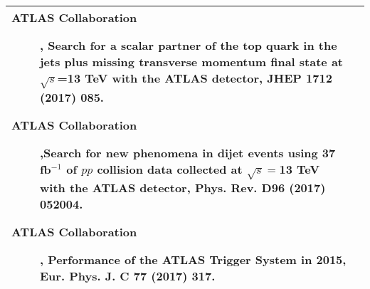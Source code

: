 \begin{center}
\begin{tabular}{|p{}|p{}|}
{\begin{description}
\item [ATLAS Collaboration], Search for a scalar partner of the top quark in the jets plus missing transverse momentum final state at $\sqrt{s}$=13 TeV with the ATLAS detector, JHEP {\bf 1712} (2017) 085. 
\item [ATLAS Collaboration],Search for new phenomena in dijet events using 37 fb$^{-1}$ of $pp$ collision data collected at $\sqrt{s}=$13 TeV with the ATLAS detector, Phys. Rev. {\bf D96 } (2017) 052004.
\item [ATLAS Collaboration], Performance of the ATLAS Trigger System in 2015, 
Eur. Phys. J. C {\bf 77} (2017) 317. 

\end{description}}\tabularnewline\bottomrule

\end{tabular}
\end{center}
